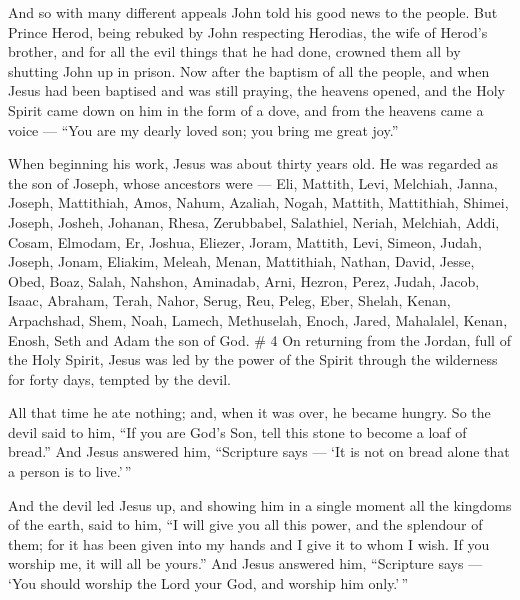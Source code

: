  And so with many different appeals John told his good news
to the people.  But Prince Herod, being rebuked by John
respecting Herodias, the wife of Herod's brother, and for all the evil
things that he had done,  crowned them all by shutting John
up in prison.  Now after the baptism of all the people, and
when Jesus had been baptised and was still praying, the heavens opened,
 and the Holy Spirit came down on him in the form of a
dove, and from the heavens came a voice --- ``You are my dearly loved
son; you bring me great joy.''

 When beginning his work, Jesus was about thirty years old.
He was regarded as the son of Joseph, whose ancestors were --- Eli,
 Mattith, Levi, Melchiah, Janna, Joseph, 
Mattithiah, Amos, Nahum, Azaliah, Nogah,  Mattith,
Mattithiah, Shimei, Joseph, Josheh,  Johanan, Rhesa,
Zerubbabel, Salathiel, Neriah,  Melchiah, Addi, Cosam,
Elmodam, Er,  Joshua, Eliezer, Joram, Mattith, Levi,
 Simeon, Judah, Joseph, Jonam, Eliakim, 
Meleah, Menan, Mattithiah, Nathan, David,  Jesse, Obed,
Boaz, Salah, Nahshon,  Aminadab, Arni, Hezron, Perez,
Judah,  Jacob, Isaac, Abraham, Terah, Nahor, 
Serug, Reu, Peleg, Eber, Shelah,  Kenan, Arpachshad, Shem,
Noah, Lamech,  Methuselah, Enoch, Jared, Mahalalel, Kenan,
 Enosh, Seth and Adam the son of God. \# 4  On
returning from the Jordan, full of the Holy Spirit, Jesus was led by the
power of the Spirit through the wilderness for forty days, tempted by
the devil.

 All that time he ate nothing; and, when it was over, he
became hungry.  So the devil said to him, ``If you are God's
Son, tell this stone to become a loaf of bread.''  And Jesus
answered him, ``Scripture says --- `It is not on bread alone that a
person is to live.'\,''

 And the devil led Jesus up, and showing him in a single
moment all the kingdoms of the earth, said to him,  ``I will
give you all this power, and the splendour of them; for it has been
given into my hands and I give it to whom I wish.  If you
worship me, it will all be yours.''  And Jesus answered him,
``Scripture says --- `You should worship the Lord your God, and worship
him only.'\,''

